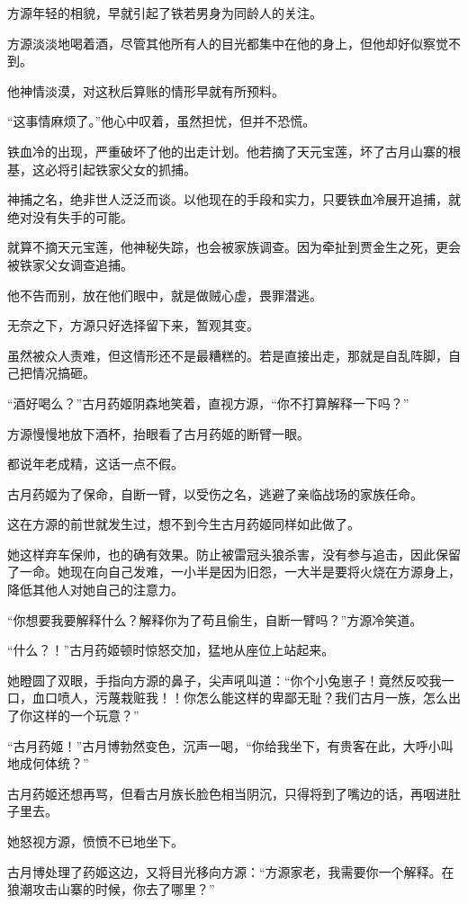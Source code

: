\begin{this_body}
方源年轻的相貌，早就引起了铁若男身为同龄人的关注。

方源淡淡地喝着酒，尽管其他所有人的目光都集中在他的身上，但他却好似察觉不到。

他神情淡漠，对这秋后算账的情形早就有所预料。

“这事情麻烦了。”他心中叹着，虽然担忧，但并不恐慌。

铁血冷的出现，严重破坏了他的出走计划。他若摘了天元宝莲，坏了古月山寨的根基，这必将引起铁家父女的抓捕。

神捕之名，绝非世人泛泛而谈。以他现在的手段和实力，只要铁血冷展开追捕，就绝对没有失手的可能。

就算不摘天元宝莲，他神秘失踪，也会被家族调查。因为牵扯到贾金生之死，更会被铁家父女调查追捕。

他不告而别，放在他们眼中，就是做贼心虚，畏罪潜逃。

无奈之下，方源只好选择留下来，暂观其变。

虽然被众人责难，但这情形还不是最糟糕的。若是直接出走，那就是自乱阵脚，自己把情况搞砸。

“酒好喝么？”古月药姬阴森地笑着，直视方源，“你不打算解释一下吗？”

方源慢慢地放下酒杯，抬眼看了古月药姬的断臂一眼。

都说年老成精，这话一点不假。

古月药姬为了保命，自断一臂，以受伤之名，逃避了亲临战场的家族任命。

这在方源的前世就发生过，想不到今生古月药姬同样如此做了。

她这样弃车保帅，也的确有效果。防止被雷冠头狼杀害，没有参与追击，因此保留了一命。她现在向自己发难，一小半是因为旧怨，一大半是要将火烧在方源身上，降低其他人对她自己的注意力。

“你想要我要解释什么？解释你为了苟且偷生，自断一臂吗？”方源冷笑道。

“什么？！”古月药姬顿时惊怒交加，猛地从座位上站起来。

她瞪圆了双眼，手指向方源的鼻子，尖声吼叫道：“你个小兔崽子！竟然反咬我一口，血口喷人，污蔑栽赃我！！你怎么能这样的卑鄙无耻？我们古月一族，怎么出了你这样的一个玩意？”

“古月药姬！”古月博勃然变色，沉声一喝，“你给我坐下，有贵客在此，大呼小叫地成何体统？”

古月药姬还想再骂，但看古月族长脸色相当阴沉，只得将到了嘴边的话，再咽进肚子里去。

她怒视方源，愤愤不已地坐下。

古月博处理了药姬这边，又将目光移向方源：“方源家老，我需要你一个解释。在狼潮攻击山寨的时候，你去了哪里？”


\end{this_body}
